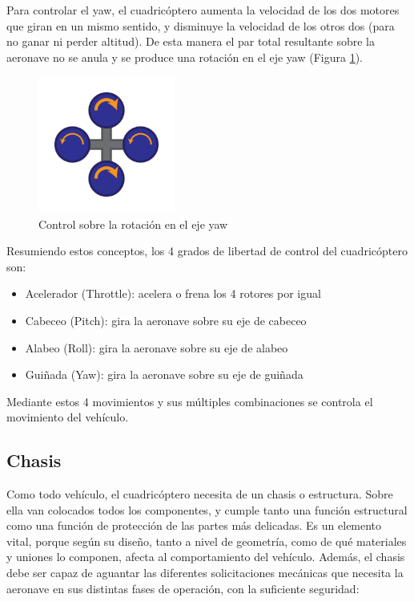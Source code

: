 \documentclass[12pt,twoside]{article}
\begin{document}
		Para controlar el yaw, el cuadricóptero aumenta la velocidad de los dos motores que giran en un mismo sentido, y disminuye la velocidad de los otros dos (para no ganar ni perder altitud). De esta manera el par total resultante sobre la aeronave no se anula y se produce una rotación en el eje yaw (Figura \ref{fig:quadrotoryaw}).
		
		\begin{figure}
			\centering
			\includegraphics[width=0.4\textwidth]{Imatges/Funcionament/quadrotoryaw.png}
			\caption{Control sobre la rotación en el eje yaw}
			\label{fig:quadrotoryaw}
		\end{figure}
		
		Resumiendo estos conceptos, los 4 grados de libertad de control del cuadricóptero son:
		
		\begin{itemize}

			\item Acelerador (Throttle): acelera o frena los 4 rotores por igual
			\item Cabeceo (Pitch): gira la aeronave sobre su eje de cabeceo 
			\item Alabeo (Roll): gira la aeronave sobre su eje de alabeo
			\item	Guiñada (Yaw): gira la aeronave sobre su eje de guiñada

		\end{itemize}
		
		Mediante estos 4 movimientos y sus múltiples combinaciones se controla el movimiento del vehículo.

		\subsection{Chasis}\label{subsec:chasis}
		
		Como todo vehículo, el cuadricóptero necesita de un chasis o estructura. Sobre ella van colocados todos los componentes, y cumple tanto una función estructural como una función de protección de las partes más delicadas.
Es un elemento vital, porque según su diseño, tanto a nivel de geometría, como de qué materiales y uniones lo componen, afecta al comportamiento del vehículo. Además, el chasis debe ser capaz de aguantar las diferentes solicitaciones mecánicas que necesita la aeronave en sus distintas fases de operación, con la suficiente seguridad:
\end{document}
